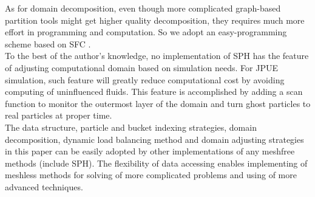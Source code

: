 \documentclass[conference,compsoc]{IEEEtran}
\begin{document}
As for domain decomposition, even though more complicated graph-based partition tools\cite{biswas1999experiments} might get higher quality decomposition, they requires much more effort in programming and computation. So we adopt an easy-programming scheme based on SFC \cite{patra1999efficient}.\\
To the best of the author's knowledge, no implementation of SPH has the feature of adjusting computational domain based on simulation needs. For JPUE simulation, such feature will greatly reduce computational cost by avoiding computing of uninfluenced fluids. This feature is accomplished by adding a scan function to monitor the outermost layer of the domain and turn ghost particles to real particles at proper time.\\
The data structure, particle and bucket indexing strategies, domain decomposition, dynamic load balancing method and domain adjusting strategies in this paper can be easily adopted by other implementations of any meshfree methods (include SPH). The flexibility of data accessing enables implementing of meshless methods for solving of more complicated problems and using of more advanced techniques.
\end{document}
